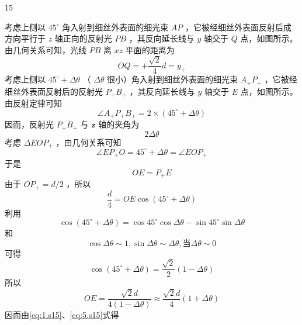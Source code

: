 \begin{solution}{15}
\begin{subsolution}
考虑上侧以 $45^{\circ}$ 角入射到细丝外表面的细光束 $AP$ ，它被经细丝外表面反射后成方向平行于 $z$ 轴正向的反射光 $PB$ ，其反向延长线与 $y$ 轴交于 $Q$ 点，如图所示。由几何关系可知，光线 $PB$ 离 $xz$ 平面的距离为
\begin{equation}
O Q = + \frac {\sqrt {2}}{4} d = y _ {+}
\label{eq:1.s15}
\end{equation}
考虑上侧以 $45^{\circ} + \Delta\theta$ （ $\Delta\theta$ 很小）角入射到细丝外表面的细光束 $A_{+}P_{+}$ ，它被经细丝外表面反射后的反射光 $P_{+}B_{+}$ ，其反向延长线与 $y$ 轴交于 $E$ 点，如图所示。由反射定律可知
\begin{equation}
\angle A _ {+} P _ {+} B _ {+} = 2 \times (45 ^ {\circ} + \Delta \theta)
\label{eq:2.s15}
\end{equation}
因而，反射光 $P_{+}B_{+}$ 与 $\mathbf{z}$ 轴的夹角为
\begin{equation}
2 \Delta \theta
\label{eq:3.s15}
\end{equation}
考虑 $\Delta EOP_{+}$ ，由几何关系可知
\begin{equation*}
\angle E P _ {+} O = 45 ^ {\circ} + \Delta \theta = \angle E O P _ {+}
\end{equation*}
于是
\begin{equation}
O E = P _ {+} E
\label{eq:4.s15}
\end{equation}
由于 $OP_{+}=d/2$ ，所以
\begin{equation*}
\frac {d}{4} = O E \cos (45 ^ {\circ} + \Delta \theta)
\end{equation*}
利用
\begin{equation*}
\cos (45 ^ {\circ} + \Delta \theta) = \cos 45 ^ {\circ} \cos \Delta \theta - \sin 45 ^ {\circ} \sin \Delta \theta
\end{equation*}
和
\begin{equation*}
\cos \Delta \theta \sim 1, \sin \Delta \theta \sim \Delta \theta , \text {当} \Delta \theta \sim 0
\end{equation*}
可得
\begin{equation*}
\cos (45 ^ {\circ} + \Delta \theta) = \frac {\sqrt {2}}{2} (1 - \Delta \theta)
\end{equation*}
所以
\begin{equation}
O E = \frac {\sqrt {2} d}{4 (1 - \Delta \theta)} \approx \frac {\sqrt {2} d}{4} (1 + \Delta \theta)
\label{eq:5.s15}
\end{equation}
因而由\eqref{eq:1.s15}、\eqref{eq:5.s15}式得

\end{subsolution}
\end{solution}
